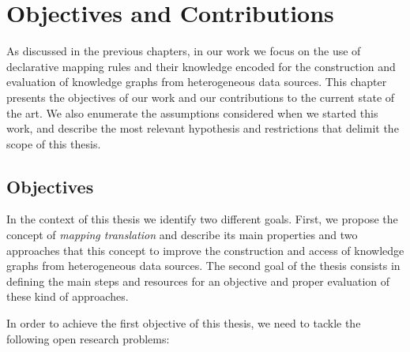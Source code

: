 \chapter{Objectives and Contributions}
\label{chap:objectives}
As discussed in the previous chapters, in our work we focus on the use of declarative mapping rules and their knowledge encoded for the construction and evaluation of knowledge graphs from heterogeneous data sources. This chapter presents the objectives of our work and our contributions to the current state of the art. We also enumerate the assumptions considered when we started this work, and describe the most relevant hypothesis and restrictions that delimit the scope of this thesis.

\section{Objectives}
In the context of this thesis we identify two different goals. First, we propose the concept of \textit{mapping translation} and describe its main properties and two approaches that this concept to improve the construction and access of knowledge graphs from heterogeneous data sources. The second goal of the thesis consists in defining the main steps and resources for an objective and proper evaluation of these kind of approaches.


In order to achieve the first objective of this thesis, we need to tackle the following open research problems:

